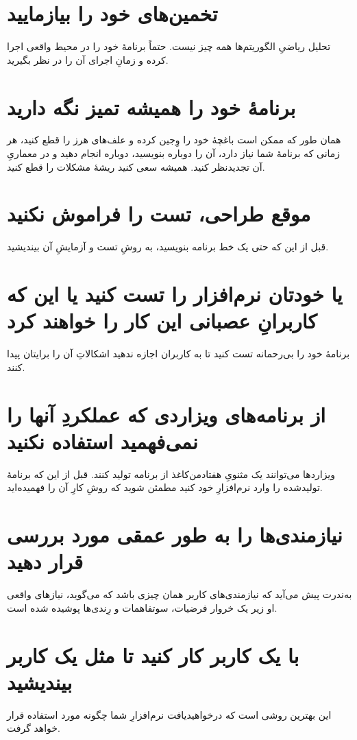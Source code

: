 \documentclass[10pt, a4paper]{book}
\begin{document}
    \section{تخمین‌های خود را بیازمایید}
    تحلیل ریاضیِ الگوریتم‌ها همه چیز نیست. حتماً برنامهٔ خود را در محیط واقعی اجرا کرده و زمانِ اجرای آن را در نظر بگیرید.
    
    \section{برنامهٔ خود را همیشه تمیز نگه دارید}
    همان طور که ممکن است باغچهٔ خود را وِجین کرده و علف‌های هرز را قطع کنید، هر زمانی که برنامهٔ شما نیاز دارد، آن را دوباره بنویسید، دوباره انجام دهید و در معماریِ آن تجدیدنظر کنید. همیشه سعی کنید ریشهٔ مشکلات را قطع کنید.
    
    \section{موقع طراحی، تست را فراموش نکنید}
    قبل از این که حتی یک خط برنامه بنویسید، به روشِ تست و آزمایشِ آن بیندیشید.

    \section{یا خودتان نرم‌افزار را تست کنید یا این که کاربرانِ عصبانی این کار را خواهند کرد}
    برنامهٔ خود را بی‌رحمانه تست کنید تا به کاربران اجازه ندهید اشکالاتِ آن را برایتان پیدا کنند.

    \section{از برنامه‌های ویزاردی که عملکردِ آنها را نمی‌فهمید استفاده نکنید}
    ویزاردها می‌توانند یک مثنویِ هفتادمن‌کاغذ از برنامه تولید کنند. قبل از این که برنامهٔ تولیدشده را وارد نرم‌افزارِ خود کنید مطمئن شوید که روشِ کارِ آن را فهمیده‌اید.

    \section{نیازمندی‌ها را به طور عمقی مورد بررسی قرار دهید}
    به‌ندرت پیش می‌آید که نیازمندی‌های کاربر همان چیزی باشد که می‌گوید، نیازهای واقعی او زیر یک خروار فرضیات، سوتفاهمات و رِندی‌ها پوشیده شده است.

    \section{با یک کاربر کار کنید تا مثل یک کاربر بیندیشید}
    این بهترین روشی است که درخواهیدیافت نرم‌افزارِ شما چگونه مورد استفاده قرار خواهد گرفت.
\end{document}
